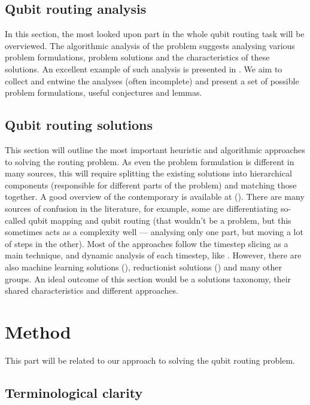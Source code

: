 \subsection{Qubit routing analysis}


In this section, the most looked upon part in the whole qubit routing task will be overviewed. The algorithmic analysis of the problem suggests analysing various problem formulations, problem solutions and the characteristics of these solutions. An excellent example of such analysis is presented in \cite{itoAlgorithmicTheoryQubit2023}. We aim to collect and entwine the analyses (often incomplete) and present a set of possible problem formulations, useful conjectures and lemmas. 

\subsection{Qubit routing solutions}

This section will outline the most important heuristic and algorithmic approaches to solving the routing problem. As even the problem formulation is different in many sources, this will require splitting the existing solutions into hierarchical components (responsible for different parts of the problem) and matching those together. A good overview of the contemporary is available at (\cite{barnesSurveyQubitRouting2023}). There are many sources of confusion in the literature, for example, some are differentiating so-called qubit mapping and qubit routing (that wouldn’t be a problem, but this sometimes acts as a complexity well — analysing only one part, but moving a lot of steps in the other). Most of the approaches follow the timestep slicing as a main technique, and dynamic analysis of each timestep, like \cite{cowtanQubitRoutingProblem2019}. However, there are also machine learning solutions (\cite{pozziUsingReinforcementLearning2020}), reductionist solutions (\cite{molaviQubitMappingRouting2022}) and many other groups. An ideal outcome of this section would be a solutions taxonomy, their shared characteristics and different approaches.

\section{Method}

This part will be related to our approach to solving the qubit routing problem.

\subsection{Terminological clarity}

